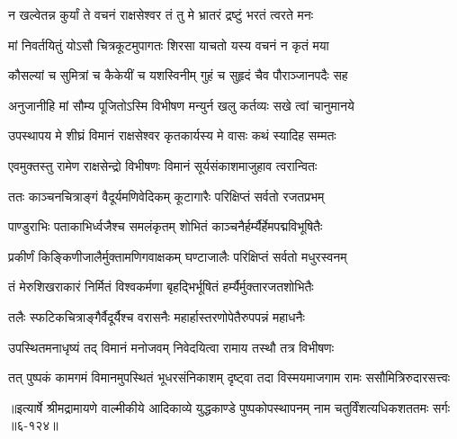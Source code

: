 \twolineshloka
{न खल्वेतन्न कुर्यां ते वचनं राक्षसेश्वर}
{तं तु मे भ्रातरं द्रष्टुं भरतं त्वरते मनः} %

\twolineshloka
{मां निवर्तयितुं योऽसौ चित्रकूटमुपागतः}
{शिरसा याचतो यस्य वचनं न कृतं मया} %

\twolineshloka
{कौसल्यां च सुमित्रां च कैकेयीं च यशस्विनीम्}
{गुहं च सुहृदं चैव पौराञ्जानपदैः सह} %

\twolineshloka
{अनुजानीहि मां सौम्य पूजितोऽस्मि विभीषण}
{मन्युर्न खलु कर्तव्यः सखे त्वां चानुमानये} %

\twolineshloka
{उपस्थापय मे शीघ्रं विमानं राक्षसेश्वर}
{कृतकार्यस्य मे वासः कथं स्यादिह सम्मतः} %

\twolineshloka
{एवमुक्तस्तु रामेण राक्षसेन्द्रो विभीषणः}
{विमानं सूर्यसंकाशमाजुहाव त्वरान्वितः} %

\twolineshloka
{ततः काञ्चनचित्राङ्गं वैदूर्यमणिवेदिकम्}
{कूटागारैः परिक्षिप्तं सर्वतो रजतप्रभम्} %

\twolineshloka
{पाण्डुराभिः पताकाभिर्ध्वजैश्च समलंकृतम्}
{शोभितं काञ्चनैर्हर्म्यैर्हेमपद्मविभूषितैः} %

\twolineshloka
{प्रकीर्णं किङ्किणीजालैर्मुक्तामणिगवाक्षकम्}
{घण्टाजालैः परिक्षिप्तं सर्वतो मधुरस्वनम्} %

\twolineshloka
{तं मेरुशिखराकारं निर्मितं विश्वकर्मणा}
{बृहद्भिर्भूषितं हर्म्यैर्मुक्तारजतशोभितैः} %

\twolineshloka
{तलैः स्फटिकचित्राङ्गैर्वैदूर्यैश्च वरासनैः}
{महार्हास्तरणोपेतैरुपपन्नं महाधनैः} %

\twolineshloka
{उपस्थितमनाधृष्यं तद् विमानं मनोजवम्}
{निवेदयित्वा रामाय तस्थौ तत्र विभीषणः} %

\twolineshloka
{तत् पुष्पकं कामगमं विमानमुपस्थितं भूधरसंनिकाशम्}
{दृष्ट्वा तदा विस्मयमाजगाम रामः ससौमित्रिरुदारसत्त्वः} %


॥इत्यार्षे श्रीमद्रामायणे वाल्मीकीये आदिकाव्ये युद्धकाण्डे पुष्पकोपस्थापनम् नाम चतुर्विंशत्यधिकशततमः सर्गः ॥६-१२४॥
